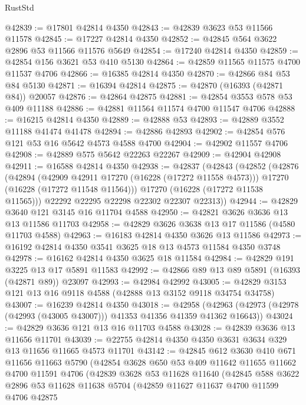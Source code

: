 \begin{lexlean}{RustStd}
\begin{coremodule}
@42839 := @17801 @42814 @4350
@42843 := @42839 @3623 @53 @11566 @11578
@42845 := @17227 @42814 @4350
@42852 := @42845 @564 @3622 @2896 @53 @11566 @11576 @5649
@42854 := @17240 @42814 @4350
@42859 := @42854 @156 @3621 @53 @410 @5130
@42864 := @42859 @11565 @11575 @4700 @11537 @4706
@42866 := @16385 @42814 @4350
@42870 := @42866 @84 @53 @84 @5130
@42871 := @16394 @42814
@42875 := @42870 (@16393 (@42871 @84)) @20057
@42876 := @42864 @42875
@42881 := @42854 @3553 @578 @53 @409 @11188
@42886 := @42881 @11564 @11574 @4700 @11547 @4706
@42888 := @16215 @42814 @4350
@42889 := @42888 @53
@42893 := @42889 @3552 @11188 @41474 @41478
@42894 := @42886 @42893
@42902 := @42854 @576 @121 @53 @16 @5642 @4573 @4588 @4700
@42904 := @42902 @11557 @4706
@42908 := @42889 @575 @5642 @22263 @22267
@42909 := @42904 @42908
@42911 := @16588 @42814 @4350
@42938 := @42837
    (@42843
      (@42852
        (@42876
          (@42894
            (@42909 @42911 @17270 (@16228 (@17272 @11558 @4573)))
            @17270
            (@16228 (@17272 @11548 @11564)))
          @17270
          (@16228 (@17272 @11538 @11565)))
        @22292
        @22295
        @22298
        @22302
        @22307
        @22313))
@42944 := @42829 @3640 @121 @3145 @16 @11704 @4588
@42950 := @42821 @3626 @3636 @13 @13 @11586 @11703
@42958 := @42829 @3626 @3638 @13 @17 @11586 (@4580 @11703 @4588)
@42963 := @16183 @42814 @4350 @3626 @13 @11586
@42973 := @16192 @42814 @4350 @3541 @3625 @18 @13 @4573 @11584 @4350 @3748
@42978 := @16162 @42814 @4350 @3625 @18 @11584
@42984 := @42829 @191 @3225 @13 @17 @5891 @11583
@42992 := @42866 @89 @13 @89 @5891 (@16393 (@42871 @89)) @23097
@42993 := @42984 @42992
@43005 := @42829 @3153 @121 @13 @16 @9118 @4588 (@42888 @13 @3152 @9118 @34754 @34758)
@43007 := @16239 @42814 @4350
@43018 := @42958
    (@42963 (@42973 (@42978 (@42993 (@43005 @43007))) @41353 @41356 @41359 @41362 @16643))
@43024 := @42829 @3636 @121 @13 @16 @11703 @4588
@43028 := @42839 @3636 @13 @11656 @11701
@43039 := @22755 @42814 @4350 @4350 @3631 @3634 @329 @13 @11656 @11665 @4573 @11701
@43142 := @42845
    @612
    @3630
    @410
    @671
    @11656
    @11663
    @5790
    (@42854
      @3628
      @650
      @53
      @409
      @11642
      @11655
      @11662
      @4700
      @11591
      @4706
      (@42839
        @3628
        @53
        @11628
        @11640
        (@42845
          @588
          @3622
          @2896
          @53
          @11628
          @11638
          @5704
          (@42859
            @11627
            @11637
            @4700
            @11599
            @4706
            @42875

\end{coremodule}
\end{lexlean}
